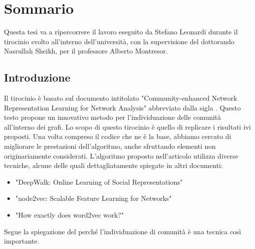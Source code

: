 %
%
%
\chapter{Sommario}
Questa tesi va a ripercorrere il lavoro eseguito da Stefano Leonardi durante il tirocinio svolto all'interno dell'università, con la supervisione del dottorando Nasrullah Sheikh, per il professore Alberto Montresor.
%
\section{Introduzione}
Il tirocinio è basato sul documento intitolato "Community-enhanced Network Representation Learning for Network Analysis"\cite{CNRL_paper} abbreviato dalla sigla \cnrl. Questo testo propone un innovativo metodo per l'individuazione delle comunità all'interno dei grafi. Lo scopo di questo tirocinio è quello di replicare i risultati ivi proposti. Una volta compreso il codice che ne è la base, abbiamo cercato di migliorare le prestazioni dell'algoritmo, anche sfruttando elementi non originariamente considerati.\newline
L'algoritmo proposto nell'articolo utilizza diverse tecniche, alcune delle quali dettagliatamente spiegate in altri documenti:
\begin{itemize}
	\item "DeepWalk: Online Learning of Social Representations"\cite{DW_paper}
	\item "node2vec: Scalable Feature Learning for Networks"\cite{N2V_paper}
	\item "How exactly does word2vec work?"\cite{W2V_paper}
\end{itemize} 
Segue la spiegazione del perché l'individuazione di comunità è una tecnica così importante.
%
